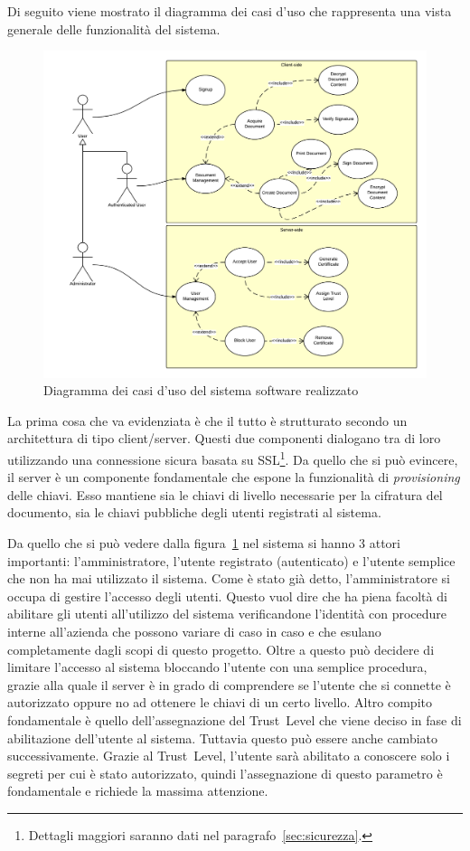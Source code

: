 Di seguito viene mostrato il diagramma dei casi d'uso che rappresenta una vista generale delle funzionalità del sistema.
	\begin{center}	
		\begin{figure}[H]
		\centering
		\includegraphics[scale=0.9]{Immagini/usecase}
		\caption[Use Case Diagram]{Diagramma dei casi d'uso del sistema software realizzato}
		\label{fig:usecase}
		\end{figure}
	\end{center}
La prima cosa che va evidenziata è che il tutto è strutturato secondo un architettura di tipo client/server. Questi due componenti dialogano tra di loro utilizzando una connessione sicura basata su SSL\footnote{Dettagli maggiori saranno dati nel paragrafo~\ref{sec:sicurezza}.}. Da quello che si può evincere, il server è un componente fondamentale che espone la funzionalità di \emph{provisioning} delle chiavi. Esso mantiene sia le chiavi di livello necessarie per la cifratura del documento, sia le chiavi pubbliche degli utenti registrati al sistema.

Da quello che si può vedere dalla figura~\ref{fig:usecase} nel sistema si hanno 3 attori importanti: l'amministratore, l'utente registrato (autenticato) e l'utente semplice che non ha mai utilizzato il sistema.
Come è stato già detto, l'amministratore si occupa di gestire l'accesso degli utenti. Questo vuol dire che ha piena facoltà di abilitare gli utenti all'utilizzo del sistema verificandone l'identità con procedure interne all'azienda che possono variare di caso in caso e che esulano completamente dagli scopi di questo progetto.
Oltre a questo può decidere di limitare l'accesso al sistema bloccando l'utente con una semplice procedura, grazie alla quale il server è in grado di comprendere se l'utente che si connette è autorizzato oppure no ad ottenere le chiavi di un certo livello.
Altro compito fondamentale è quello dell'assegnazione del Trust~Level che viene deciso in fase di abilitazione dell'utente al sistema. Tuttavia questo può essere anche cambiato successivamente. Grazie al Trust~Level, l'utente sarà abilitato a conoscere solo i segreti per cui è stato autorizzato, quindi l'assegnazione di questo parametro è fondamentale e richiede la massima attenzione.

